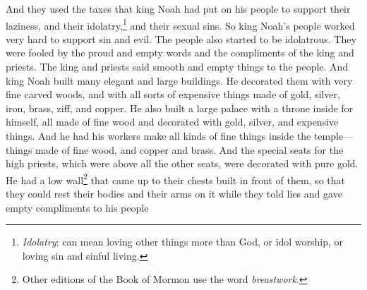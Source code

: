 And they used the taxes that king Noah had put on his people to support their laziness, and their idolatry,\footnote{\textit{Idolatry}: can mean loving other things more than God, or idol worship, or loving sin and sinful living.} and their sexual sins. So king Noah's people worked very hard to support sin and evil.
\bverse \iffalse Yea, and they also became idolatrous, because they were deceived by the vain and flattering words of the king and priests; for they did speak flattering things unto them. \fi
The people also started to be idolatrous. They were fooled by the proud and empty words and the compliments of the king and priests. The king and priests said smooth and empty things to the people.
\bverse \iffalse And it came to pass that king Noah built many elegant and spacious buildings; and he ornamented them with fine work of wood, and of all manner of precious things, of gold, and of silver, and of iron, and of brass, and of ziff, and of copper; \fi
And king Noah built many elegant and large buildings. He decorated them with very fine carved woods, and with all sorts of expensive things made of gold, silver, iron, brass, ziff, and copper.
\bverse \iffalse And he also built him a spacious palace, and a throne in the midst thereof, all of which was of fine wood and was ornamented with gold and silver and with precious things. \fi
He also built a large palace with a throne inside for himself, all made of fine wood and decorated with gold, silver, and expensive things.
\bverse \iffalse And he also caused that his workmen should work all manner of fine work within the walls of the temple, of fine wood, and of copper, and of brass. \fi
And he had his workers make all kinds of fine things inside the temple---things made of fine wood, and copper and brass.
\bverse \iffalse And the seats which were set apart for the high priests, which were above all the other seats, he did ornament with pure gold; and he caused a breastwork to be built before them, that they might rest their bodies and their arms upon while they should speak lying and vain words to his people. \fi
And the special seats for the high priests, which were above all the other seats, were decorated with pure gold. He had a low wall\footnote{Other editions of the Book of Mormon use the word \textit{breastwork}.} that came up to their chests built in front of them, so that they could rest their bodies and their arms on it while they told lies and gave empty compliments to his people
\bverse \iffalse And it came to pass that he built a tower near the temple; yea, a very high tower, even so high that he could stand upon the top thereof and overlook the land of Shilom, and also the land of Shemlon, which was possessed by the Lamanites; and he could even look over all the land round about. \fi
